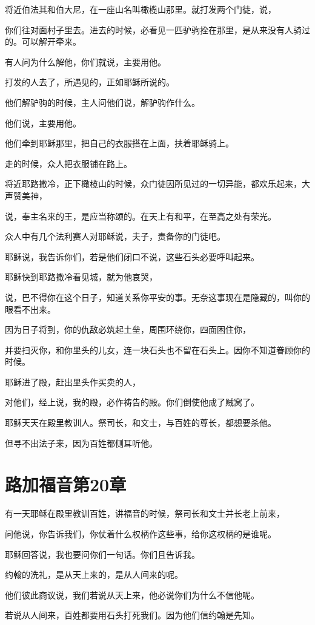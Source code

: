 \documentclass[12pt,oneside]{book}
\begin{document}
将近伯法其和伯大尼，在一座山名叫橄榄山那里。就打发两个门徒，说，

你们往对面村子里去。进去的时候，必看见一匹驴驹拴在那里，是从来没有人骑过的。可以解开牵来。

有人问为什么解他，你们就说，主要用他。

打发的人去了，所遇见的，正如耶稣所说的。

他们解驴驹的时候，主人问他们说，解驴驹作什么。

他们说，主要用他。

他们牵到耶稣那里，把自己的衣服搭在上面，扶着耶稣骑上。

走的时候，众人把衣服铺在路上。

将近耶路撒冷，正下橄榄山的时候，众门徒因所见过的一切异能，都欢乐起来，大声赞美神，

说，奉主名来的王，是应当称颂的。在天上有和平，在至高之处有荣光。

众人中有几个法利赛人对耶稣说，夫子，责备你的门徒吧。

耶稣说，我告诉你们，若是他们闭口不说，这些石头必要呼叫起来。

耶稣快到耶路撒冷看见城，就为他哀哭，

说，巴不得你在这个日子，知道关系你平安的事。无奈这事现在是隐藏的，叫你的眼看不出来。

因为日子将到，你的仇敌必筑起土垒，周围环绕你，四面困住你，

并要扫灭你，和你里头的儿女，连一块石头也不留在石头上。因你不知道眷顾你的时候。

耶稣进了殿，赶出里头作买卖的人，

对他们，经上说，我的殿，必作祷告的殿。你们倒使他成了贼窝了。

耶稣天天在殿里教训人。祭司长，和文士，与百姓的尊长，都想要杀他。

但寻不出法子来，因为百姓都侧耳听他。

\chapter{路加福音第20章}
有一天耶稣在殿里教训百姓，讲福音的时候，祭司长和文士并长老上前来，

问他说，你告诉我们，你仗着什么权柄作这些事，给你这权柄的是谁呢。

耶稣回答说，我也要问你们一句话。你们且告诉我。

约翰的洗礼，是从天上来的，是从人间来的呢。

他们彼此商议说，我们若说从天上来，他必说你们为什么不信他呢。

若说从人间来，百姓都要用石头打死我们。因为他们信约翰是先知。
\end{document}
